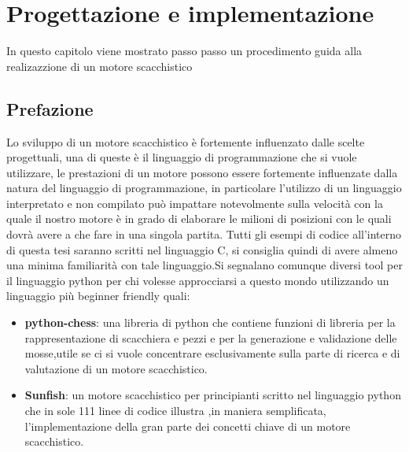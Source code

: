 \chapter{Progettazione e implementazione} %
%

\begin{citazione}
    In questo capitolo viene mostrato passo passo un procedimento guida alla realizazzione di un motore scacchistico
\end{citazione}

\newpage
\section{Prefazione} %
Lo sviluppo di un motore scacchistico è fortemente influenzato dalle scelte progettuali,
una di queste è il linguaggio di programmazione che si vuole utilizzare,
le prestazioni di un motore possono essere fortemente influenzate dalla natura del linguaggio di
programmazione, in particolare l'utilizzo di un linguaggio interpretato e non compilato può impattare
notevolmente sulla velocità con la quale il nostro motore è in grado di elaborare le milioni di
posizioni con le quali dovrà avere a che fare in una singola partita.
Tutti gli esempi di codice all'interno di questa tesi saranno scritti nel linguaggio C, si consiglia
quindi di avere almeno una minima familiarità con tale linguaggio.Si segnalano comunque diversi
tool  per il linguaggio python per chi volesse approcciarsi a questo mondo utilizzando un
linguaggio più beginner friendly  quali:
\begin{itemize}
    \item \textbf{python-chess}: una libreria di python che contiene funzioni di libreria per la rappresentazione
          di scacchiera e pezzi e per la generazione e validazione delle mosse,utile se ci si vuole concentrare
          esclusivamente sulla parte di ricerca e di valutazione  di un motore scacchistico.
    \item \textbf{Sunfish}: un motore scacchistico per principianti scritto nel linguaggio python che
          in sole 111 linee di codice illustra ,in maniera semplificata, l'implementazione della
          gran parte dei concetti  chiave di un motore scacchistico.

\end{itemize}



